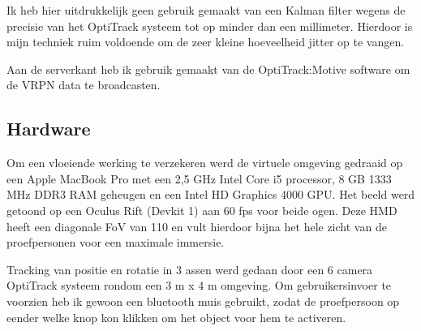 Ik heb hier uitdrukkelijk geen gebruik gemaakt van een Kalman filter wegens de
precisie van het OptiTrack systeem tot op minder dan een millimeter. Hierdoor
is mijn techniek ruim voldoende om de zeer kleine hoeveelheid jitter op te
vangen.

Aan de serverkant heb ik gebruik gemaakt van de OptiTrack:Motive software om de
VRPN data te broadcasten.


\subsection{Hardware}
Om een vloeiende werking te verzekeren werd de virtuele omgeving gedraaid op een
Apple MacBook Pro met een 2,5 GHz Intel Core i5 processor, 8 GB 1333 MHz DDR3 RAM
geheugen en een Intel HD Graphics 4000 GPU. Het beeld werd getoond op een Oculus 
Rift (Devkit 1) aan 60 fps voor beide ogen. Deze HMD heeft een diagonale FoV van 
110\textdegree{} en vult hierdoor bijna het hele zicht van de proefpersonen voor 
een maximale immersie.

Tracking van positie en rotatie in 3 assen werd gedaan door een 6 camera
OptiTrack systeem rondom een 3 m x 4 m omgeving. Om gebruikersinvoer te voorzien 
heb ik gewoon een bluetooth muis gebruikt, zodat de proefpersoon op eender welke 
knop kon klikken om het object voor hem te activeren.